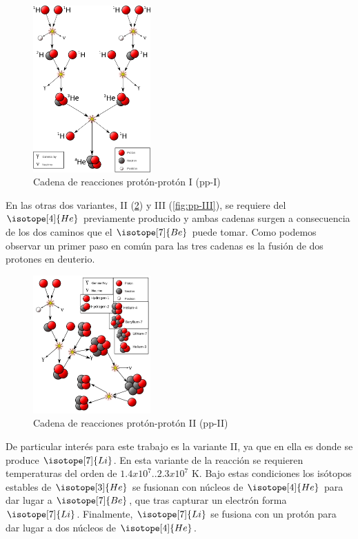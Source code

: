 \begin{figure}
	\centering
	\includegraphics[width=0.4\textwidth]{img/tesis/pp-I.png}
	\caption {Cadena de reacciones protón-protón I (pp-I)}
	\label{fig:pp-I}
\end{figure}

En las otras dos variantes, II (\ref{fig:pp-II}) y III (\ref{fig:pp-III}), se requiere del $\isotope[4]{He}$ previamente producido y ambas cadenas surgen a consecuencia de los dos caminos que el $\isotope[7]{Be}$ puede tomar. Como podemos observar un primer paso en común para las tres cadenas es la fusión de dos protones en deuterio.

\begin{figure}
	\centering
	\includegraphics[width=0.4\textwidth]{img/tesis/pp-II.png}
	\caption {Cadena de reacciones protón-protón II (pp-II)}
	\label{fig:pp-II}
\end{figure}

De particular interés para este trabajo es la variante II, ya que en ella es donde se produce $\isotope[7]{Li}$. En esta variante de la reacción se requieren temperaturas del orden de $1.4x10^7..2.3x10^7$ K. Bajo estas condiciones los isótopos estables de $\isotope[3]{He}$ se fusionan con núcleos de $\isotope[4]{He}$ para dar lugar a $\isotope[7]{Be}$, que tras capturar un electrón forma $\isotope[7]{Li}$. Finalmente, $\isotope[7]{Li}$ se fusiona con un protón para dar lugar a dos núcleos de $\isotope[4]{He}$.\par


